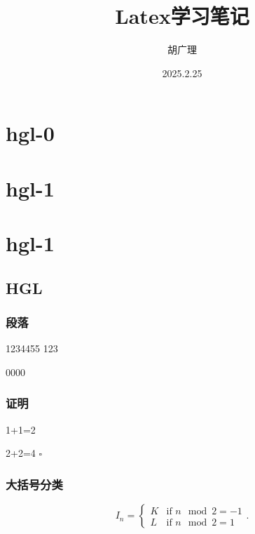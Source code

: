 \documentclass{article}
\title{Latex学习笔记}
\author{胡广理}
\date{2025.2.25}
\newenvironment{proof}{{\noindent\it 证明}\quad}{\hfill $\square$\par}
\begin{document}
\maketitle


\tableofcontents


\section{hgl-0}


\section{hgl-1}   %


\section*{hgl-1}   %


\subsection{HGL}   %

\subsubsection{段落}   %
1234455   %
123

0000

\subsubsection{证明}

\begin{proof}  %

1+1=2

2+2=4
\end{proof}

\subsubsection{大括号分类}

\[   %
I_n = \begin{cases} 
K & \text{if } n \mod 2 = -1 \\
L & \text{if } n \mod 2 = 1 
\end{cases}.
\]
\end{document}
